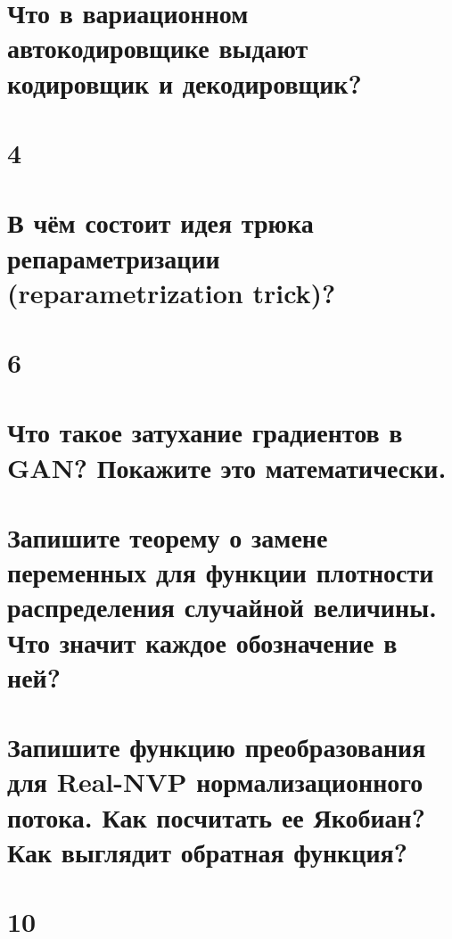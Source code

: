 \documentclass[14pt]{extarticle}
\begin{document}
	\newpage
	\section{Что в вариационном автокодировщике выдают кодировщик и декодировщик?} 
	
	
	\newpage
	\section{4} %
	
	
	\newpage
	\section{В чём состоит идея трюка репараметризации (reparametrization trick)?} %
	
	
	\newpage
	\section{6} %
	
	
	\newpage
	\section{Что такое затухание градиентов в GAN? Покажите это математически.} %
	
	
	\newpage
	
	\section{Запишите теорему о замене переменных для функции плотности распределения случайной величины. Что значит каждое обозначение в ней?} %
	
	
	\newpage
	
	\section{Запишите функцию преобразования для Real-NVP нормализационного потока. Как посчитать ее Якобиан? Как выглядит обратная функция?} %
	
	
	\newpage
	
	\section{10} %
	
	
\end{document}
